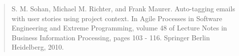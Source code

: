 \documentclass{ucalgthes1}
\begin{document}
\begin{quote}
	S. M. Sohan, Michael M. Richter, and Frank Maurer. Auto-tagging emails with user stories using project context. In Agile Processes in Software 	Engineering and Extreme Programming, volume 48 of Lecture Notes in Business Information Processing, pages 103 - 116. Springer Berlin Heidelberg, 2010.
\end{quote}


\begin{singlespace}
\newpage
{}
\tableofcontents
\pagestyle{plain}
\newpage
{}
\listoftables
\pagestyle{plain}
\newpage
{}
\listoffigures
\pagestyle{plain}
\clearpage
\end{singlespace}
\clearpage          %













\end{document}
